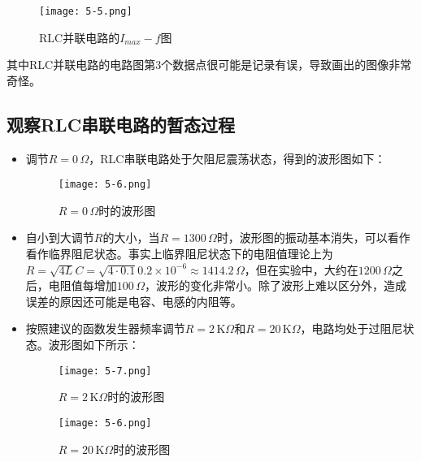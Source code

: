 \documentclass[12pt]{article}
\begin{document}
\newpage

\begin{figure}[htbp]
    \centering
    \texttt{[image: 5-5.png]}
    \caption{RLC并联电路的$I_{max}-f$图}
\end{figure}

其中RLC并联电路的电路图第3个数据点很可能是记录有误，导致画出的图像非常奇怪。

\subsection{观察RLC串联电路的暂态过程}
\begin{itemize}
    \item 调节$R=0\,\Omega$，RLC串联电路处于欠阻尼震荡状态，得到的波形图如下：
    
    \begin{figure}[htbp]
        \centering
        \texttt{[image: 5-6.png]}
        \caption{$R=0\,\Omega$时的波形图}
    \end{figure}

    \item 自小到大调节$R$的大小，当$R=1300\,\Omega$时，波形图的振动基本消失，可以看作看作临界阻尼状态。事实上临界阻尼状态下的电阻值理论上为$R=\sqrt{4L}{C}=\sqrt{4\cdot0.1}{0.2\times10^{-6}}\approx1414.2\,\Omega$，但在实验中，大约在$1200\,\Omega$之后，电阻值每增加$100\,\Omega$，波形的变化非常小。除了波形上难以区分外，造成误差的原因还可能是电容、电感的内阻等。
    \item 按照建议的函数发生器频率调节$R=2\,\mathrm{K}\Omega$和$R=20\,\mathrm{K}\Omega$，电路均处于过阻尼状态。波形图如下所示：
    
    \begin{figure}[htbp]
        \centering
        \texttt{[image: 5-7.png]}
        \caption{$R=2\,\mathrm{K}\Omega$时的波形图}
    \end{figure}

    \begin{figure}[htbp]
        \centering
        \texttt{[image: 5-6.png]}
        \caption{$R=20\,\mathrm{K}\Omega$时的波形图}
    \end{figure}
\end{itemize}
\end{document}
